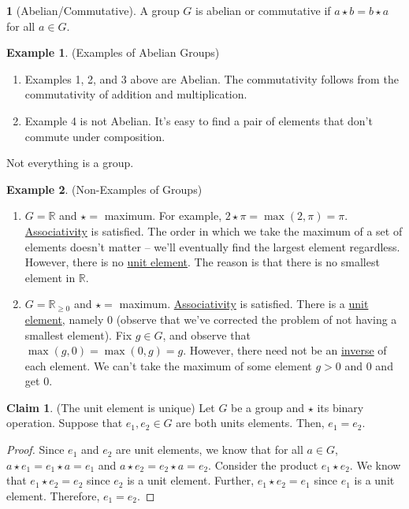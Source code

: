 \documentclass[12pt]{article}
\theoremstyle{definition}
\newtheorem{definition}{\color{NavyBlue}{\textbf{Definition}}}
\newtheorem{claim}{\color{JungleGreen}Claim}
\newtheorem{example}{\color{WildStrawberry}Example}
\theoremstyle{definition}
\begin{document}
\begin{definition}[Abelian/Commutative]
A group $G$ is abelian or commutative if $a \star b = b \star a$ for all $a \in G$.
\end{definition}

\begin{example}(Examples of Abelian Groups)
\begin{enumerate}
\item Examples 1, 2, and 3 above are Abelian. The commutativity follows from the commutativity of addition and multiplication.
\item Example 4 is not Abelian. It's easy to find a pair of elements that don't commute under composition.
\end{enumerate}
\end{example}

Not everything is a group.
\begin{example}(Non-Examples of Groups)
\begin{enumerate}
\item $G = \mathbb{R}$ and $\star =$ maximum. For example, $2 \star \pi = \max(2,\pi) = \pi$. \underline{Associativity} is satisfied. The order in which we take the maximum of a set of elements doesn't matter -- we'll eventually find the largest element regardless. However, there is no \underline{unit element}. The reason is that there is no smallest element in $\mathbb{R}$.  
\item $G = \mathbb{R}_{\geq 0}$ and $\star =$ maximum. \underline{Associativity} is satisfied. There is a \underline{unit element}, namely $0$ (observe that we've corrected the problem of not having a smallest element). Fix $g \in G$, and observe that $\max(g,0) = \max(0,g) = g$. However, there need not be an \underline{inverse} of each element. We can't take the maximum of some element $g > 0$ and $0$ and get $0$.
\end{enumerate}
\end{example}

\begin{claim}(The unit element is unique)
Let $G$ be a group and $\star$ its binary operation. Suppose that $e_1, e_2 \in G$ are both units elements. Then, $e_1 = e_2$.
\end{claim}
\begin{proof}
Since $e_1$ and $e_2$ are unit elements, we know that for all $a \in G$, $a \star e_1 = e_1 \star a = e_1$ and $a \star e_2 = e_2 \star a = e_2$. Consider the product $e_1 \star e_2$. We know that $e_1 \star e_2 = e_2$ since $e_2$ is a unit element. Further, $e_1 \star e_2 = e_1$ since $e_1$ is a unit element. Therefore, $e_1 = e_2$. 
\end{proof}
\end{document}
